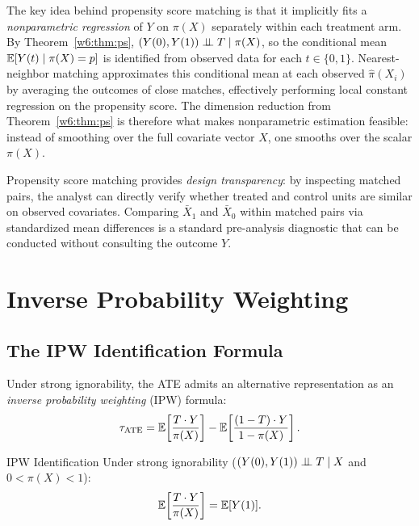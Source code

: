 \documentclass[master.tex]{subfiles}
\begin{document}
\begin{remark}
The key idea behind propensity score matching is that it implicitly fits
a \emph{nonparametric regression} of $Y$ on $\pi(X)$ separately within
each treatment arm.  By Theorem~\ref{w6:thm:ps}, $(Y(0), Y(1)) \perp\!\!\!\perp T
\mid \pi(X)$, so the conditional mean $\mathbb{E}[Y(t) \mid \pi(X) = p]$ is
identified from observed data for each $t \in \{0, 1\}$.  Nearest-neighbor
matching approximates this conditional mean at each observed $\hat\pi(X_i)$
by averaging the outcomes of close matches, effectively performing local
constant regression on the propensity score.  The dimension reduction from
Theorem~\ref{w6:thm:ps} is therefore what makes nonparametric estimation
feasible: instead of smoothing over the full covariate vector $X$, one
smooths over the scalar $\pi(X)$.
\end{remark}

\begin{remark}
Propensity score matching provides \emph{design transparency}: by
inspecting matched pairs, the analyst can directly verify whether
treated and control units are similar on observed covariates.
Comparing $\bar X_1$ and $\bar X_0$ within matched pairs via
standardized mean differences is a standard pre-analysis diagnostic
that can be conducted without consulting the outcome $Y$.
\end{remark}

\section{Inverse Probability Weighting}
\label{w6:sec:ipw}

\subsection{The IPW Identification Formula}

Under strong ignorability, the ATE admits an alternative representation
as an \emph{inverse probability weighting} (IPW) formula:
\[
  \tau_{\mathrm{ATE}}
  = \mathbb{E}\!\left[\frac{T \cdot Y}{\pi(X)}\right]
  - \mathbb{E}\!\left[\frac{(1-T)\cdot Y}{1-\pi(X)}\right].
\]

\begin{thm}{IPW Identification}
\label{w6:thm:ipw}
Under strong ignorability ($(Y(0), Y(1)) \perp\!\!\!\perp T \mid X$ and
$0 < \pi(X) < 1$):
\[
  \mathbb{E}\!\left[\frac{T \cdot Y}{\pi(X)}\right] = \mathbb{E}[Y(1)].
\]
\end{thm}
\end{document}
